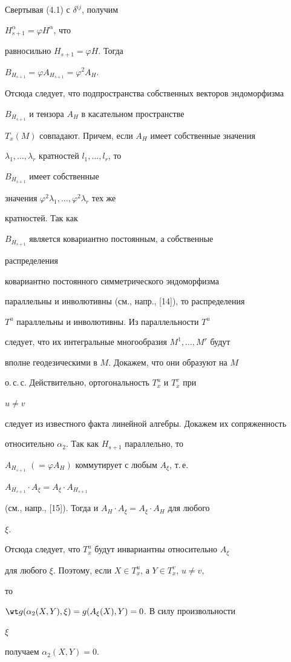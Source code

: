 \begin{pf}
Свертывая (4.1) с $\delta^{ij}$, получим


$H^\alpha_{s+1}=\varphi H^\alpha$, что


равносильно $H_{s+1}=\varphi H$. Тогда


$B_{H_{s+1}}=\varphi A_{H_{s+1}}=\varphi^2 A_H$.


Отсюда следует, что подпространства собственных векторов эндоморфизма


$B_{H_{s+1}}$ и тензора $A_H$ в касательном пространстве


$T_x(M)$ совпадают. Причем, если $A_H$ имеет собственные значения


$\lambda_1,\dotsc,\lambda_r$ кратностей $l_1,\dotsc,l_r$, то


$B_{H_{s+1}}$ имеет собственные


значения $\varphi^2\lambda_1,\dotsc,\varphi^2\lambda_r$ тех же


кратностей. Так как


$B_{H_{s+1}}$ является ковариантно постоянным, а собственные


распределения


ковариантно постоянного симметрического эндоморфизма


параллельны и инволютивны (см., напр., [14]), то распределения


$T^u$ параллельны и инволютивны. Из параллельности $T^u$


следует, что их интегральные многообразия $M^1,\dotsc,M^r$ будут


вполне геодезическими в $M$. Докажем, что они образуют на $M$


о.\,с.\,с. Действительно, ортогональность $T^u_x$ и $T^v_x$ при


$u\ne v$


следует из известного факта линейной алгебры. Докажем их сопряженность


относительно $\alpha_2$. Так как $H_{s+1}$ параллельно, то


$A_{H_{s+1}}$ $(=\varphi A_H)$ коммутирует с любым $A_\xi$, т.\,е.


$A_{H_{s+1}}\cdot A_\xi=A_\xi\cdot A_{H_{s+1}}$


(см., напр., [15]). Тогда и $A_H\cdot A_\xi=A_\xi\cdot A_H$ для любого


$\xi$.


Отсюда следует, что $T^u_x$ будут инвариантны относительно $A_\xi$


для любого $\xi$. Поэтому, если $X\in T^u_x$, а $Y\in T^v_x$, $u\ne v$,


то


$\wt g(\alpha_2(X,Y),\xi)=g(A_\xi(X),Y)=0$. В силу произвольности


$\xi$


получаем $\alpha_2(X,Y)=0$.


\end{pf}





